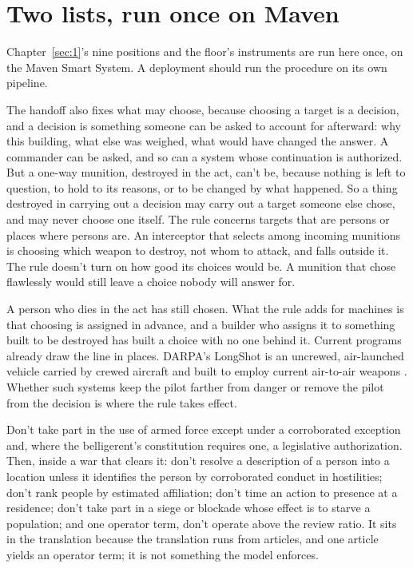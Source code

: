 \section{Two lists, run once on Maven}
\label{sec:17.3}
Chapter~\ref{sec:1}'s nine positions and the floor's instruments are run here once, on the Maven Smart System. A deployment should run the procedure on its own pipeline.


The handoff also fixes what may choose, because choosing a target is a decision, and a decision is something someone can be asked to account for afterward: why this building, what else was weighed, what would have changed the answer. A commander can be asked, and so can a system whose continuation is authorized. But a one-way munition, destroyed in the act, can't be, because nothing is left to question, to hold to its reasons, or to be changed by what happened. So a thing destroyed in carrying out a decision may carry out a target someone else chose, and may never choose one itself. The rule concerns targets that are persons or places where persons are. An interceptor that selects among incoming munitions is choosing which weapon to destroy, not whom to attack, and falls outside it. The rule doesn't turn on how good its choices would be. A munition that chose flawlessly would still leave a choice nobody will answer for.

A person who dies in the act has still chosen. What the rule adds for machines is that choosing is assigned in advance, and a builder who assigns it to something built to be destroyed has built a choice with no one behind it. Current programs already draw the line in places. DARPA's LongShot is an uncrewed, air-launched vehicle carried by crewed aircraft and built to employ current air-to-air weapons \autocite{darpa2026longshot}. Whether such systems keep the pilot farther from danger or remove the pilot from the decision is where the rule takes effect.


Don't take part in the use of armed force except under a corroborated exception and, where the belligerent's constitution requires one, a legislative authorization. Then, inside a war that clears it: don't resolve a description of a person into a location unless it identifies the person by corroborated conduct in hostilities; don't rank people by estimated affiliation; don't time an action to presence at a residence; don't take part in a siege or blockade whose effect is to starve a population; and one operator term, don't operate above the review ratio. It sits in the translation because the translation runs from articles, and one article yields an operator term; it is not something the model enforces.

